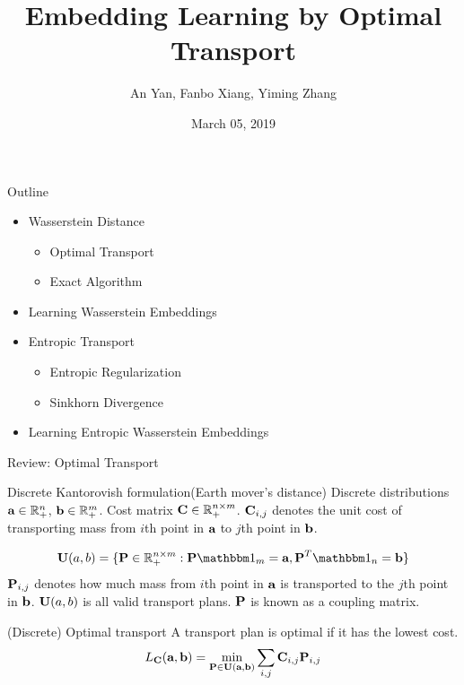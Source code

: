 \documentclass{beamer}
\title{Embedding Learning by Optimal Transport}
\author{An Yan, Fanbo Xiang, Yiming Zhang}
\date{March 05, 2019}
\renewcommand{\b}{\textbf}
\newcommand{\mb}{\mathbb}
\newcommand{\mbm}{\mathbbm}
\newcommand{\set}[1]{\{#1\}}
\begin{document}
\begin{frame}[plain]
\titlepage
\end{frame}


\begin{frame}{Outline} 
  \begin{itemize}
  \item Wasserstein Distance 
    \begin{itemize}
    \item Optimal Transport
    \item Exact Algorithm
    \end{itemize}
  \item Learning Wasserstein Embeddings
  \item Entropic Transport
    \begin{itemize}
    \item Entropic Regularization
    \item Sinkhorn Divergence
    \end{itemize}
  \item Learning Entropic Wasserstein Embeddings
  \end{itemize}
\end{frame}


\begin{frame}{Review: Optimal Transport}
  \begin{block}{Discrete Kantorovish formulation(Earth mover's distance)}
    Discrete distributions $\b a\in \mb R_+^{n}$, $\b b \in \mb R_+^{m}$. Cost
    matrix $\b C\in \mb R_+^{n\times m}$. $\b C_{i,j}$ denotes the unit cost of
    transporting mass from $i$th point in $\b a$ to $j$th point in $\b b$.
    
    \[\b U(a, b) = \set{\b P\in \mb R_+^{n\times m} : \b P \mbm 1_m = \b a, \b P^T
        \mbm 1_n = \b b} \]
    $\b P_{i,j}$ denotes how much mass from $i$th point in $\b a$ is transported
    to the $j$th point in $\b b$. $\b U(a, b)$ is all valid transport plans. $\b P$
    is known as a coupling matrix.
  \end{block}
  \begin{block}{(Discrete) Optimal transport}
    A transport plan is optimal if it has the lowest cost.
    \[L_{\b C}(\b a, \b b) = \min_{\b P \in \b U(\b a,\b b)}\sum_{i,j}\b
      C_{i,j}\b P_{i,j}\]
  \end{block}
\end{frame}
\end{document}
